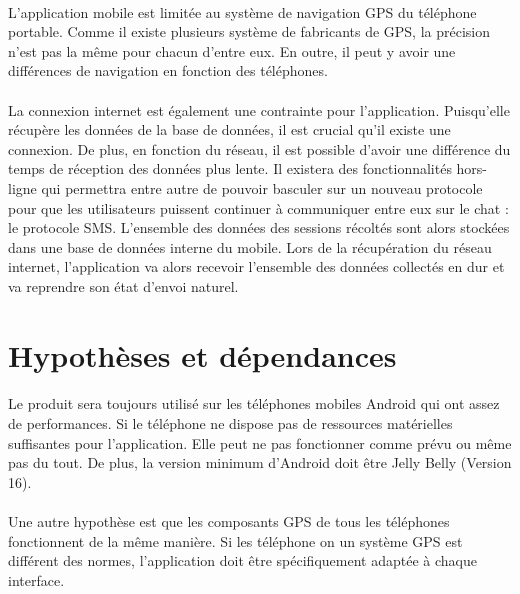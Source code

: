 \documentclass[titlepage, 12pt]{report}
\begin{document}
\paragraph{}L'application mobile est limitée au système de navigation GPS du téléphone portable. Comme il existe plusieurs système de fabricants de GPS, la précision n'est pas la même pour chacun d'entre eux. En outre, il peut y avoir une différences de navigation en fonction des téléphones.

\paragraph{}La connexion internet est également une contrainte pour l'application. Puisqu'elle récupère les données de la base de données, il est crucial qu'il existe une connexion. De plus, en fonction du réseau, il est possible d'avoir une différence du temps de réception des données plus lente.
Il existera des fonctionnalités hors-ligne qui permettra entre autre de pouvoir basculer sur un nouveau protocole pour que les utilisateurs puissent continuer à communiquer entre eux sur le chat : le protocole SMS. L'ensemble des données des sessions récoltés sont alors stockées dans une base de données interne du mobile. Lors de la récupération du réseau internet, l'application va alors recevoir l'ensemble des données collectés en dur et va reprendre son état d'envoi naturel.

\section{Hypothèses et dépendances}

\paragraph{}Le produit sera toujours utilisé sur les téléphones mobiles Android qui ont assez de performances. Si le téléphone ne dispose pas de ressources matérielles suffisantes pour l'application. Elle peut ne pas fonctionner comme prévu ou même pas du tout.
De plus, la version minimum d'Android doit être Jelly Belly (Version 16). 

\paragraph{}Une autre hypothèse est que les composants GPS de tous les téléphones fonctionnent de la même manière. Si les téléphone on un système GPS est différent des normes, l'application doit être spécifiquement adaptée à chaque interface.
\end{document}
